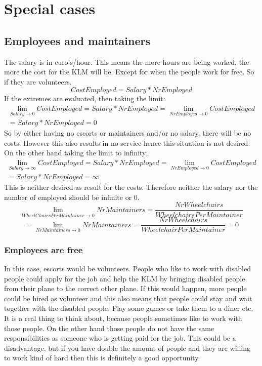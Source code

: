\documentclass[a4paper, 11pt, notitlepage]{report}
\begin{document}
\chapter{Special cases}
\section{Employees and maintainers}
The salary is in euro's/hour. This means the more hours are being worked, the more the cost for the KLM will be. Except for when the people work for free. So if they are volunteers.\\
\begin{equation}
CostEmployed = Salary * NrEmployed
\end{equation}
If the extremes are evaluated, then taking the limit:
\begin{multline}
\lim_{Salary \rightarrow 0}CostEmployed = Salary * NrEmployed = \lim_{NrEmployed \rightarrow 0}CostEmployed \\ = Salary * NrEmployed = 0
\end{multline}
So by either having no escorts or maintainers and/or no salary, there will be no costs. However this also results in no service hence this situation is not desired. On the other hand taking the limit to infinity;
\begin{multline}
\lim_{Salary \rightarrow \infty} CostEmployed = Salary * NrEmployed = \lim_{NrEmployed \rightarrow 0} CostEmployed \\ = Salary * NrEmployed = \infty
\end{multline}
This is neither desired as result for the costs. Therefore neither the salary nor the number of employed should be infinite or 0.
\begin{equation}
\lim_{WheelChairsPerMaintainer \rightarrow 0} NrMaintainers = \frac{NrWheelchairs}{WheelchairsPerMaintainer}
\end{equation}
\begin{equation}
= \lim_{NrMaintainers \rightarrow 0}NrMaintainers = \frac{NrWheelchairs}{WheelchairPerMaintainer} = 0
\end{equation}


\subsection{Employees are free}
In this case, escorts would be volunteers. People who like to work with disabled people could apply for the job and help the KLM by bringing disabled people from their plane to the correct other plane. If this would happen, more people could be hired as volunteer and this also means that people could stay and wait together with the disabled people. Play some games or take them to a diner etc. It is a real thing to think about, because people sometimes like to work with those people. On the other hand those people do not have the same responsibilities as someone who is getting paid for the job. This could be a disadvantage, but if you have double the amount of people and they are willing to work kind of hard then this is definitely a good opportunity.
\end{document}
